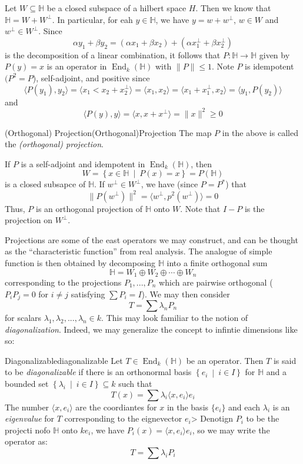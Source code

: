 \documentclass[oneside]{book}
\renewcommand{\H}{\mathbb{H}}
\newcommand{\sse}{\subseteq}
\newcommand{\End}{\operatorname{End}}
\newcommand{\set}[2]{\left\{#1 \ \middle|\ #2\right\}}
\begin{document}
Let $W \sse \H$ be a closed subspace of a hilbert space $H$. Then we know that $\H = W + W^\perp$. In particular,
for eah $y \in \H$, we have $y = w + w^\perp$, $w \in W$ and $w^\perp \in W^\perp$. Since
\[
	\alpha y_1 + \beta y_2 = (\alpha x_1 + \beta x_2) + (\alpha x_1^\perp + \beta x_2^\perp)
\]
is the decomposition of a linear combination, it follows that $P: \H \to \H$ given by $P(y) = x$ is an operator in
$\End_k(\H)$ with $\|P\| \le 1$. Note $P$ is idempotent $(P^2 = P$), self-adjoint, and positive since
\[
	 \langle P(y_1), y_2 \rangle = \langle x_1< x_2 + x_2^\perp \rangle = \langle x_1, x_2 \rangle = \langle x_1
	 + x_1^{\perp}, x_2 \rangle = \langle y_1, P(y_2) \rangle
\]
and
\[
    \langle P(y), y \rangle = \langle x, x+x^\perp \rangle = \|x\|^2 \ge 0
\]
\begin{defn}{(Orthogonal) Projection}{(Orthogonal)Projection}
 	The map $P$ in the above is called the \emph{(orthogonal) projection}.
\end{defn}

If $P$ is a self-adjoint and idempotent in $\End_k(\H)$, then
\[
	W = \set{x \in \H}{P(x) = x} = P(\H)
\]
is a closed subsapce of $\H$. If $w^\perp \in W^\perp$, we have (since $P = P^*$) that
\[
	\|P(w^\perp)\|^2 = \langle w^\perp, p^2(w^\perp) \rangle = 0
\]
Thus, $P$ is an orthogonal projection of $\H$ onto $W$. Note that $I-P$ is the projection on $W^\perp$.

Projections are some of the east operators we may construct, and can be thought as the ``characteristic function'' from
real analysis. The analogue of simple function is then obtained by decomposing $\H$ into a finite orthogonal sum
\[
	\H = W_1 \oplus W_2\oplus \cdots \oplus W_n
\]
corresponding to the projections $P_1, ..., P_n$ which are pairwise orthogonal ($P_iP_j = 0$ for $i \ne j$
satisfying $\sum P_i = I$). We may then consider
\[
	T = \sum \lambda_n P_n
\]
for scalars $\lambda_1, \lambda_2, ..., \lambda_n \in k$. This may look familiar to the notion of
\emph{diagonalization}. Indeed, we may generalize the concept to infintie dimensions like so:
\begin{defn}{Diagonalizable}{diagonalizable}
	Let $T \in \End_k(\H)$ be an operator. Then $T$ is said to be \emph{diagonalizable} if there is an orthonormal
	basis $\set{e_i}{ i \in I }$ for $\H$ and a bounded set $\set{\lambda_i}{i \in I} \sse k$ such that
	\[
		T(x) = \sum \lambda_i \langle x, e_i \rangle e_i
	\]
	The number $ \langle x, e_i \rangle$ are the coordiantes for $x$ in the basis $\{e_i\}$ and each $\lambda_i$ is
	an \emph{eigenvalue} for $T$ corresponding to the eignevector $e_i$> Denotign $P_i$ to be the
	projecti nofo $\H$ onto $ke_i$, we have $P_i(x) = \langle x, e_i \rangle e_i$, so we may write the operator as:
	\[
		T = \sum \lambda_i P_i
	\]
\end{defn}
\end{document}

